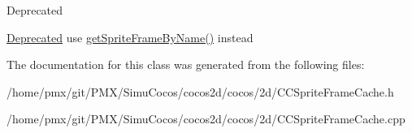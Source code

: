 \begin{DoxyRefDesc}{Deprecated}
\item[\hyperlink{deprecated__deprecated000278}{Deprecated}]use \hyperlink{classSpriteFrameCache_a36ba54daea85ff2c8a3dd6f3525eb17e}{get\+Sprite\+Frame\+By\+Name()} instead \end{DoxyRefDesc}


The documentation for this class was generated from the following files\+:\begin{DoxyCompactItemize}
\item 
/home/pmx/git/\+P\+M\+X/\+Simu\+Cocos/cocos2d/cocos/2d/C\+C\+Sprite\+Frame\+Cache.\+h\item 
/home/pmx/git/\+P\+M\+X/\+Simu\+Cocos/cocos2d/cocos/2d/C\+C\+Sprite\+Frame\+Cache.\+cpp\end{DoxyCompactItemize}

